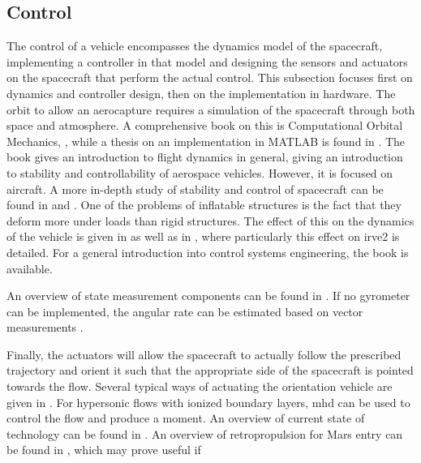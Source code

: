 \subsection{Control} \label{sec:control}
The control of a vehicle encompasses the dynamics model of the spacecraft, implementing a controller in that model and designing the sensors and actuators on the spacecraft that perform the actual control. This subsection focuses first on dynamics and controller design, then on the implementation in hardware.
The orbit to allow an aerocapture requires a simulation of the spacecraft through both space and atmosphere. A comprehensive book on this is Computational Orbital Mechanics, \cite{Weiland2004}, while a thesis on an implementation in MATLAB is found in \cite{Leszczynski1998}.
The book \cite{Mulder2013} gives an introduction to flight dynamics in general, giving an introduction to stability and controllability of aerospace vehicles. However, it is focused on aircraft. A more in-depth study of stability and control of spacecraft can be found in \cite{Steketee1967} and \cite{Ito2002}. One of the problems of inflatable structures is the fact that they deform more under loads than rigid structures. The effect of this on the dynamics of the vehicle is given in \cite{Axdahl2009} as well as in \cite{Bose2009}, where particularly this effect on \gls{irve2} is detailed. For a general introduction into control systems engineering, the book \cite{Nise2011} is available.

An overview of state measurement components can be found in \cite{Wertz2011a}. If no gyrometer can be implemented, the angular rate can be estimated based on vector measurements \cite{Azor1998}.

Finally, the actuators will allow the spacecraft to actually follow the prescribed trajectory and orient it such that the appropriate side of the spacecraft is pointed towards the flow. Several typical ways of actuating the orientation vehicle are given in \cite{Wertz2011a}. For hypersonic flows with ionized boundary layers, \gls{mhd} can be used to control the flow and produce a moment. An overview of current state of technology can be found in \cite{Braun2009}. An overview of retropropulsion for Mars entry can be found in \cite{Korzun2009}, which may prove useful if 